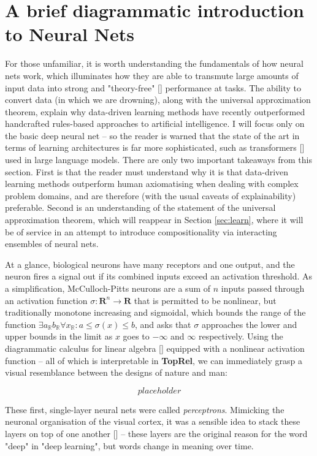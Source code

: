 \section{A brief diagrammatic introduction to Neural Nets}

For those unfamiliar, it is worth understanding the fundamentals of how neural nets work, which illuminates how they are able to transmute large amounts of input data into strong and "theory-free" [] performance at tasks. The ability to convert data (in which we are drowning), along with the universal approximation theorem, explain why data-driven learning methods have recently outperformed handcrafted rules-based approaches to artificial intelligence. I will focus only on the basic deep neural net -- so the reader is warned that the state of the art in terms of learning architectures is far more sophisticated, such as transformers [] used in large language models. There are only two important takeaways from this section. First is that the reader must understand why it is that data-driven learning methods outperform human axiomatising when dealing with complex problem domains, and are therefore (with the usual caveats of explainability) preferable. Second is an understanding of the statement of the universal approximation theorem, which will reappear in Section \ref{sec:learn}, where it will be of service in an attempt to introduce compositionality via interacting ensembles of neural nets.

 At a glance, biological neurons have many receptors and one output, and the neuron fires a signal out if its combined inputs exceed an activation threshold. As a simplification, McCulloch-Pitts neurons are a sum of $n$ inputs passed through an activation function $\sigma: \mathbf{R}^n \rightarrow \mathbf{R}$ that is permitted to be nonlinear, but traditionally monotone increasing and sigmoidal, which bounds the range of the function $\exists a_{\mathbb{R}} b_{\mathbb{R}} \forall x_{\mathbb{R}} : a \leq \sigma(x) \leq b$, and asks that $\sigma$ approaches the lower and upper bounds in the limit as $x$ goes to $-\infty$ and $\infty$ respectively. Using the diagrammatic calculus for linear algebra [] equipped with a nonlinear activation function -- all of which is interpretable in \textbf{TopRel}, we can immediately grasp a visual resemblance between the designs of nature and man:

\[placeholder\]

 These first, single-layer neural nets were called \emph{perceptrons}. Mimicking the neuronal organisation of the visual cortex, it was a sensible idea to stack these layers on top of one another [] -- these layers are the original reason for the word "deep" in "deep learning", but words change in meaning over time.

